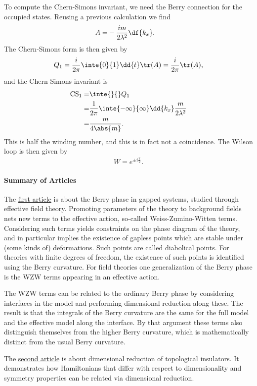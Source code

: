 To compute the Chern-Simons invariant, we need the Berry connection for the occupied states. Reusing a previous calculation we find
\begin{align*}
	A =& -\frac{im}{2\lambda^{2}}\df{k_{x}}.
\end{align*}
The Chern-Simons form is then given by
\begin{align*}
	Q_{1} = \frac{i}{2\pi}\inte{0}{1}\dd{t}\tr(A) = \frac{i}{2\pi}\tr(A),
\end{align*}
and the Chern-Simons invariant is
\begin{align*}
	\text{CS}_{1} =& \inte{}{}Q_{1} \\
	              =& \frac{1}{2\pi}\inte{-\infty}{\infty}\dd{k_{x}}\frac{m}{2\lambda^{2}} \\
	              =& \frac{m}{4\abs{m}}.
\end{align*}
This is half the winding number, and this is in fact not a coincidence. The Wilson loop is then given by
\begin{align*}
	W = e^{\pm i\frac{\pi}{2}}.
\end{align*}

\paragraph{Summary of Articles}
The \href{https://journals-aps-org.focus.lib.kth.se/prb/pdf/10.1103/PhysRevB.102.245113}{first article} is about the Berry phase in gapped systems, studied through effective field theory. Promoting parameters of the theory to background fields nets new terms to the effective action, so-called Weiss-Zumino-Witten terms. Considering such terms yields constraints on the phase diagram of the theory, and in particular implies the existence of gapless points which are stable under (some kinds of) deformations. Such points are called diabolical points. For theories with finite degrees of freedom, the existence of such points is identified using the Berry curvature. For field theories one generalization of the Berry phase is the WZW terms appearing in an effective action.

The WZW terms can be related to the ordinary Berry phase by considering interfaces in the model and performing dimensional reduction along these. The result is that the integrals of the Berry curvature are the same for the full model and the effective model along the interface. By that argument these terms also distinguish themselves from the higher Berry curvature, which is mathematically distinct from the usual Berry curvature.

The \href{https://iopscience.iop.org/article/10.1088/1367-2630/12/6/065010/pdf}{second article} is about dimensional reduction of topological insulators. It demonstrates how Hamiltonians that differ with respect to dimensionality and symmetry properties can be related via dimensional reduction.
